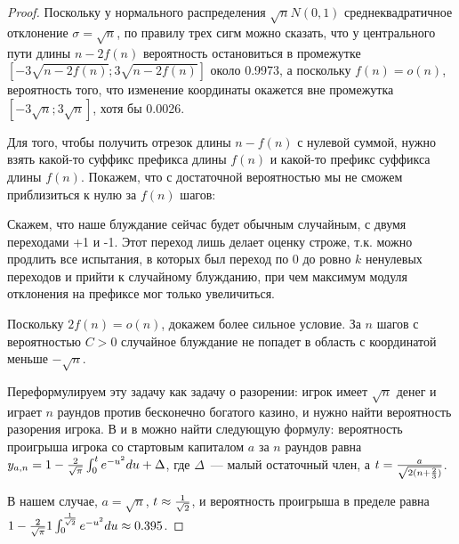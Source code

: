 \begin{proof}
Поскольку у нормального распределения $\sqrt {n} N(0,1)$ среднеквадратичное отклонение $\sigma = \sqrt{n}$, по правилу трех сигм можно сказать, что у центрального пути длины $n-2f(n)$ вероятность остановиться в промежутке $[-3\sqrt{n-2f(n)}; 3\sqrt{n-2f(n)}]$ около 0.9973, а поскольку $f(n)=o(n)$, вероятность того, что изменение координаты окажется вне промежутка $[-3\sqrt{n}; 3\sqrt{n}]$, хотя бы 0.0026. %

Для того, чтобы получить отрезок длины $n-f(n)$ с нулевой суммой, нужно взять какой-то суффикс префикса длины $f(n)$ и какой-то префикс суффикса длины $f(n)$. Покажем, что с достаточной вероятностью мы не сможем приблизиться к нулю за $f(n)$ шагов:

Скажем, что наше блуждание сейчас будет обычным случайным, с двумя переходами +1 и -1. Этот переход лишь делает оценку строже, т.к. можно продлить все испытания, в которых был переход по 0 до ровно $k$ ненулевых переходов и прийти к случайному блужданию, при чем максимум модуля отклонения на префиксе мог только увеличиться.


Поскольку $2f(n)=o(n)$, докажем более сильное условие. За $n$ шагов с вероятностью $C>0$ случайное блуждание не попадет в область с координатой меньше $-\sqrt{n}$. 

Переформулируем эту задачу как задачу о разорении: игрок имеет $\sqrt{n}$ денег и играет $n$ раундов против бесконечно богатого казино, и нужно найти вероятность разорения игрока. В \cite{7} и в \cite{8} можно найти следующую формулу: вероятность проигрыша игрока со стартовым капиталом $a$ за $n$ раундов равна $y_{a,n}=1-{{2} \over {\sqrt{\pi}}} \int_0^t e^{-u^2} du + \Delta$, где $\Delta$~--- малый остаточный член, а $t={{a} \over {\sqrt{2(n+{{2}\over 3})}}}$.

В нашем случае, $a=\sqrt n$, $t \approx {1 \over \sqrt 2}$, и вероятность проигрыша в пределе равна $1 - {2 \over \sqrt \pi}1 \int_0^{1 \over \sqrt 2} e^{-u^2} du \approx 0.395$.


\end{proof}

